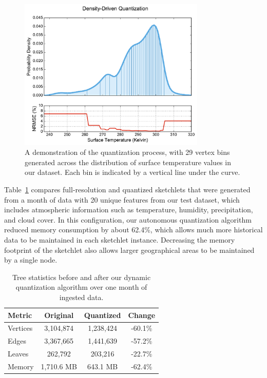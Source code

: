\begin{figure}
    \centerline{\includegraphics[width=3.5in]{figures/quantization.pdf}}
    \caption{A demonstration of the quantization process, with 29 vertex bins generated across the distribution of surface temperature values in our dataset. Each bin is indicated by a vertical line under the curve.}
    \label{fig:quantization}
\end{figure}

Table~\ref{tbl:tree-stats} compares full-resolution and quantized sketchlets that were generated from a month of data with 20 unique features from our test dataset, which includes atmospheric information such as temperature, humidity, precipitation, and cloud cover. In this configuration, our autonomous quantization algorithm reduced memory consumption by about 62.4\%, which allows much more historical data to be maintained in each sketchlet instance. Decreasing the memory footprint of the sketchlet also allows larger geographical areas to be maintained by a single node.

\begin{table}[h!]
    \renewcommand{\arraystretch}{1.3}
    \caption{Tree statistics before and after our dynamic quantization algorithm over one month of ingested data.\vspace{-1em}}
    \label{tbl:tree-stats}
    \begin{center}
        \begin{tabular}{|l|c|c|c|}
            \hline
            \textbf{Metric} & \textbf{Original} & \textbf{Quantized} & \textbf{Change} \\
            \hline
            Vertices & 3,104,874 & 1,238,424 & -60.1\% \\
            \hline
            Edges    & 3,367,665 & 1,441,639 & -57.2\% \\
            \hline
            Leaves   & 262,792   & 203,216   & -22.7\% \\
            \hline
            Memory   & 1,710.6 MB & 643.1 MB  & -62.4\% \\
            \hline
        \end{tabular}
    \end{center}
\end{table}

